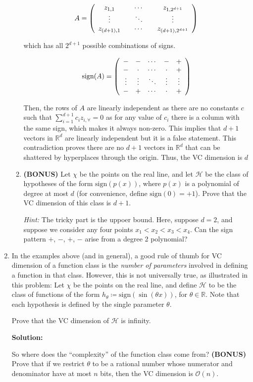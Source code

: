 \documentclass[12pt]{article}
\newcommand{\sign}[1]{\text{sign}(#1)}
\newcommand{\BigO}[1]{\mathcal{O}\left( #1 \right)}
\begin{document}
\begin{enumerate}
\begin{enumerate}
\[
  A = \left( \begin{array}{c c c c c}z_{1,1} & & \cdots & & z_{1,2^{d+1}}\\
                          \vdots &  & \ddots & & \vdots\\
                          z_{(d+1),1} & & \cdots & & z_{(d+1),2^{d+1}}\end{array}\right)
\]

which has all $2^{d+1}$ possible combinations of signs.

\[
   \text{sign}(A) = \left(\begin{array}{c c c c c}- & - & \cdots & - & +\\
                          - & \cdot & \cdots & \cdot & +\\
                          \vdots & \vdots & \ddots & \vdots & \vdots\\
                          - & + & \cdots & \cdot & +\end{array}\right)
\]

Then, the rows of $A$ are linearly independent as there are no constants $c$ such that $\sum_{i=1}^{d+1}c_{i}z_{i,\forall} = 0$ as for any value of $c_{i}$ there is a column with the same sign, which makes it always non-zero. This implies that $d+1$ vectors in $\mathbb{R}^{d}$ are linearly independent but it is a false statement. This contradiction proves there are no $d+1$ vectors in $\mathbb{R}^{d}$ that can be shattered by hyperplaces through the origin. Thus, the VC dimension is $d$

\item {\bf (BONUS)} Let $\chi$ be the points on the real line, and let $\mathcal{H}$ be the class of hypotheses of the form $\sign{p(x)}$, where $p(x)$ is a polynomial of degree at most $d$ (for convenience, define $\sign{0} = +1$). Prove that the VC dimension of this class is $d+1$. 

{\em Hint:} The tricky part is the uppoer bound. Here, suppose $d = 2$, and suppose we consider any four points $x_{1} < x_{2} < x_{3} < x_{4}$. Can the sign pattern $+$, $-$, $+$, $-$ arise from a degree 2 polynomial?
\end{enumerate}

\item In the examples above (and in general), a good rule of thumb for VC dimension of a function class is the {\em number of parameters} involved in defining a function in that class. However, this is not universally true, as illustrated in this problem: Let $\chi$ be the points on the real line, and define $\mathcal{H}$ to be the class of functions of the form $h_{\theta} \coloneqq \sign{\sin(\theta x)}$, for $\theta \in \mathbb{R}$. Note that each hypothesis is defined by the single parameter $\theta$.

Prove that the VC dimension of $\mathcal{H}$ is infinity.

{\bf Solution:}

So where does the ``complexity'' of the function class come from? {\bf (BONUS)} Prove that if we restrict $\theta$ to be a rational number whose numerator and denominator have at most $n$ bits, then the VC dimension is $\BigO{n}$.
\end{enumerate}
 
\end{document}

